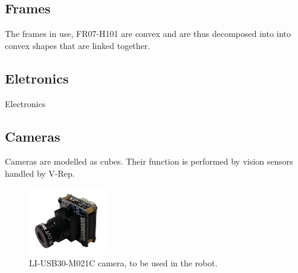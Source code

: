 \subsection{Frames}
The frames in use, FR07-H101 are convex and are thus decomposed into into convex shapes 
that are linked together. 

\subsection{Eletronics}
Electronics 

\subsection{Cameras}
Cameras are modelled as cubes. Their function is performed by vision sensors handled by V-Rep.
\begin{figure}[htp]
\center
    \includegraphics[width = 0.3\textwidth]{figures/li_cam}
    \caption{LI-USB30-M021C camera, to be used in the robot.}
    \label{fig:camera}
\end{figure}

